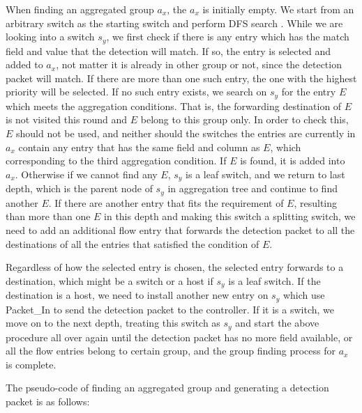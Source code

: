 When finding an aggregated group $a_x$, the $a_x$ is initially empty. We start from an arbitrary switch as the starting switch and perform DFS search . While we are looking into a switch $s_y$, we first check if there is any entry which has the match field and value that the detection will match. If so, the entry is selected and added to $a_x$, not matter it is already in other group or not, since the detection packet will match. If there are more than one such entry, the one with the highest priority will be selected. If no such entry exists, we search on $s_y$ for the entry $E$ which meets the aggregation conditions. That is, the forwarding destination of $E$ is not visited this round and $E$ belong to this group only. In order to check this, $E$ should not be used, and neither should the switches the entries are currently in $a_x$ contain any entry that has the same field and column as $E$, which corresponding to the third aggregation condition. If $E$ is found, it is added into $a_x$. Otherwise if we cannot find any $E$, $s_y$ is a leaf switch, and we return to last depth, which is the parent node of $s_y$ in aggregation tree and continue to find another $E$. If there are another entry that fits the requirement of $E$, resulting than more than one $E$ in this depth and making this switch a splitting switch, we need to add an additional flow entry that forwards the detection packet to all the destinations of all the entries that satisfied the condition of $E$.

Regardless of how the selected entry is chosen, the selected entry forwards to a destination, which might be a switch or a host if $s_y$ is a leaf switch. If the destination is a host, we need to install another new entry on $s_y$ which use Packet_In to send the detection packet to the controller. If it is a switch, we move on to the next depth, treating this switch as $s_y$ and start the above procedure all over again until the detection packet has no more field available, or all the flow entries belong to certain group, and the group finding process for $a_x$ is complete.

The pseudo-code of finding an aggregated group and generating a detection packet is as follows:

